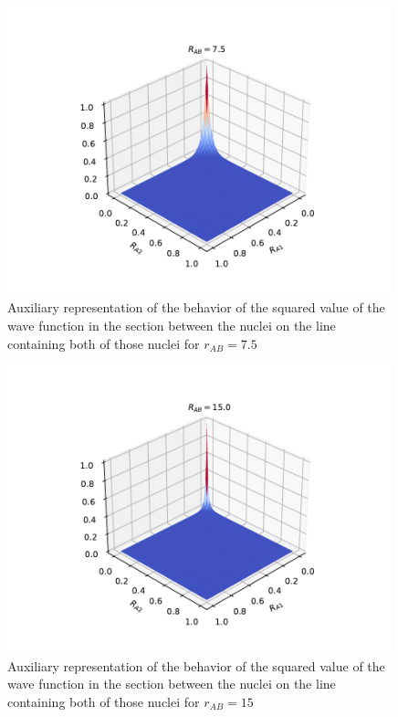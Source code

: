 \documentclass{pracalicmgr}
\begin{document}
\begin{figure}[H]
    \center
    \includegraphics[width=0.99\textwidth]{7.5 (1).pdf}
    \caption{
        Auxiliary representation of the behavior of the squared value of the wave function in the section between the nuclei on the line containing both of those nuclei for $r_{AB} = 7.5$}
    \label{wave 7.5}
\end{figure}

\begin{figure}[H]
    \center
    \includegraphics[width=0.99\textwidth]{15 (1).pdf}

    \caption{
        Auxiliary representation of the behavior of the squared value of the wave function in the section between the nuclei on the line containing both of those nuclei for $r_{AB} = 15$}
    \label{wave 15}
\end{figure}
\end{document}
